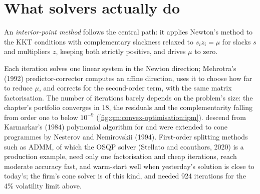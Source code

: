 \section{What solvers actually do}

\begin{definition}\label{def:qm:convex-optimisation:ipm}
An \emph{interior-point method} follows the central path: it applies Newton's method to the KKT conditions with complementary slackness relaxed to $s_iz_i = \mu$
for slacks $s$ and multipliers $z$, keeping both strictly positive, and drives $\mu$ to zero.
\end{definition}

Each iteration solves one linear system in the Newton direction; Mehrotra's (1992) predictor-corrector computes an affine direction, uses it to choose how far to reduce $\mu$, and corrects
for the second-order term, with the same matrix factorisation. The number of iterations barely depends on the problem's size: the chapter's portfolio converges in 18, the residuals
and the complementarity falling from order one to below $10^{-9}$ (\cref{fig:qm:convex-optimisation:ipm}).  descend from Karmarkar's (1984) polynomial algorithm for
 and were extended to cone programmes by Nesterov and Nemirovskii (1994). First-order splitting methods such as ADMM, of which the OSQP solver (Stellato and coauthors, 2020)
is a production example, need only one factorisation and cheap iterations, reach moderate accuracy fast, and warm-start well when yesterday's solution is close to today's; the firm's
cone solver is of this kind, and needed 924 iterations for the 4\% volatility limit above.

